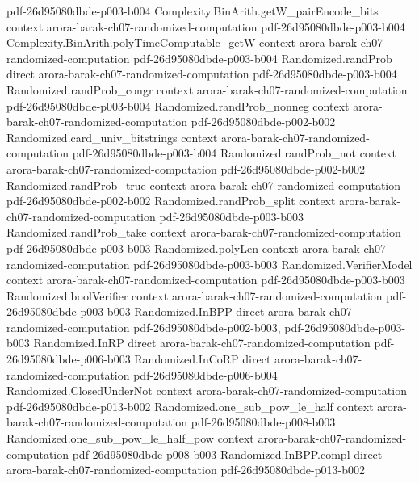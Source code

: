 \begin{theorem}
  {pdf-26d95080dbde-p003-b004}
\proofstep
  {Complexity.BinArith.getW_pairEncode_bits}
  {context}
  {arora-barak-ch07-randomized-computation}
  {pdf-26d95080dbde-p003-b004}
\proofstep
  {Complexity.BinArith.polyTimeComputable_getW}
  {context}
  {arora-barak-ch07-randomized-computation}
  {pdf-26d95080dbde-p003-b004}
\proofstep
  {Randomized.randProb}
  {direct}
  {arora-barak-ch07-randomized-computation}
  {pdf-26d95080dbde-p003-b004}
\proofstep
  {Randomized.randProb_congr}
  {context}
  {arora-barak-ch07-randomized-computation}
  {pdf-26d95080dbde-p003-b004}
\proofstep
  {Randomized.randProb_nonneg}
  {context}
  {arora-barak-ch07-randomized-computation}
  {pdf-26d95080dbde-p002-b002}
\proofstep
  {Randomized.card_univ_bitstrings}
  {context}
  {arora-barak-ch07-randomized-computation}
  {pdf-26d95080dbde-p003-b004}
\proofstep
  {Randomized.randProb_not}
  {context}
  {arora-barak-ch07-randomized-computation}
  {pdf-26d95080dbde-p002-b002}
\proofstep
  {Randomized.randProb_true}
  {context}
  {arora-barak-ch07-randomized-computation}
  {pdf-26d95080dbde-p002-b002}
\proofstep
  {Randomized.randProb_split}
  {context}
  {arora-barak-ch07-randomized-computation}
  {pdf-26d95080dbde-p003-b003}
\proofstep
  {Randomized.randProb_take}
  {context}
  {arora-barak-ch07-randomized-computation}
  {pdf-26d95080dbde-p003-b003}
\proofstep
  {Randomized.polyLen}
  {context}
  {arora-barak-ch07-randomized-computation}
  {pdf-26d95080dbde-p003-b003}
\proofstep
  {Randomized.VerifierModel}
  {context}
  {arora-barak-ch07-randomized-computation}
  {pdf-26d95080dbde-p003-b003}
\proofstep
  {Randomized.boolVerifier}
  {context}
  {arora-barak-ch07-randomized-computation}
  {pdf-26d95080dbde-p003-b003}
\proofstep
  {Randomized.InBPP}
  {direct}
  {arora-barak-ch07-randomized-computation}
  {pdf-26d95080dbde-p002-b003,
    pdf-26d95080dbde-p003-b003}
\proofstep
  {Randomized.InRP}
  {direct}
  {arora-barak-ch07-randomized-computation}
  {pdf-26d95080dbde-p006-b003}
\proofstep
  {Randomized.InCoRP}
  {direct}
  {arora-barak-ch07-randomized-computation}
  {pdf-26d95080dbde-p006-b004}
\proofstep
  {Randomized.ClosedUnderNot}
  {context}
  {arora-barak-ch07-randomized-computation}
  {pdf-26d95080dbde-p013-b002}
\proofstep
  {Randomized.one_sub_pow_le_half}
  {context}
  {arora-barak-ch07-randomized-computation}
  {pdf-26d95080dbde-p008-b003}
\proofstep
  {Randomized.one_sub_pow_le_half_pow}
  {context}
  {arora-barak-ch07-randomized-computation}
  {pdf-26d95080dbde-p008-b003}
\proofstep
  {Randomized.InBPP.compl}
  {direct}
  {arora-barak-ch07-randomized-computation}
  {pdf-26d95080dbde-p013-b002}

\end{theorem}
